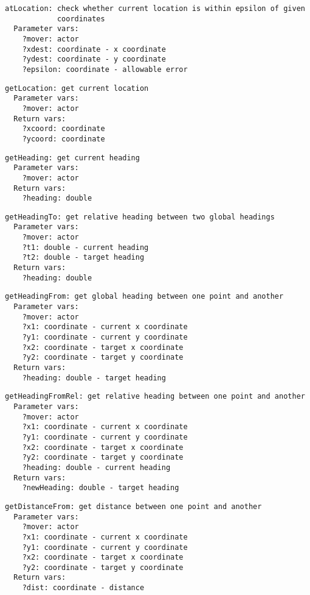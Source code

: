 \documentclass[11pt,letterpaper]{article}
\begin{document}
\begin{Verbatim}
atLocation: check whether current location is within epsilon of given
            coordinates
  Parameter vars:
    ?mover: actor
    ?xdest: coordinate - x coordinate
    ?ydest: coordinate - y coordinate
    ?epsilon: coordinate - allowable error
\end{Verbatim}

\begin{Verbatim}
getLocation: get current location
  Parameter vars:
    ?mover: actor
  Return vars:
    ?xcoord: coordinate
    ?ycoord: coordinate
\end{Verbatim}

\begin{Verbatim}
getHeading: get current heading
  Parameter vars:
    ?mover: actor
  Return vars:
    ?heading: double
\end{Verbatim}

\begin{Verbatim}
getHeadingTo: get relative heading between two global headings
  Parameter vars:
    ?mover: actor
    ?t1: double - current heading
    ?t2: double - target heading
  Return vars:
    ?heading: double
\end{Verbatim}

\begin{Verbatim}
getHeadingFrom: get global heading between one point and another
  Parameter vars:
    ?mover: actor
    ?x1: coordinate - current x coordinate
    ?y1: coordinate - current y coordinate
    ?x2: coordinate - target x coordinate
    ?y2: coordinate - target y coordinate
  Return vars:
    ?heading: double - target heading
\end{Verbatim}

\begin{Verbatim}
getHeadingFromRel: get relative heading between one point and another
  Parameter vars:
    ?mover: actor
    ?x1: coordinate - current x coordinate
    ?y1: coordinate - current y coordinate
    ?x2: coordinate - target x coordinate
    ?y2: coordinate - target y coordinate
    ?heading: double - current heading
  Return vars:
    ?newHeading: double - target heading
\end{Verbatim}

\begin{Verbatim}
getDistanceFrom: get distance between one point and another
  Parameter vars:
    ?mover: actor
    ?x1: coordinate - current x coordinate
    ?y1: coordinate - current y coordinate
    ?x2: coordinate - target x coordinate
    ?y2: coordinate - target y coordinate
  Return vars:
    ?dist: coordinate - distance
\end{Verbatim}
\end{document}
